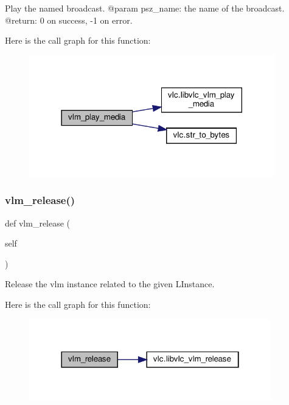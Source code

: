 \begin{DoxyVerb}Play the named broadcast.
@param psz_name: the name of the broadcast.
@return: 0 on success, -1 on error.
\end{DoxyVerb}
 Here is the call graph for this function\+:
\nopagebreak
\begin{figure}[H]
\begin{center}
\leavevmode
\includegraphics[width=302pt]{classvlc_1_1_instance_a7d5047e2733ed1a7c7713bf9c097395d_cgraph}
\end{center}
\end{figure}
\mbox{\label{classvlc_1_1_instance_a68523ebc1badf01d410514dbc5d822de}} 
\subsubsection{\texorpdfstring{vlm\+\_\+release()}{vlm\_release()}}
{\footnotesize\ttfamily def vlm\+\_\+release (\begin{DoxyParamCaption}\item[{}]{self }\end{DoxyParamCaption})}

\begin{DoxyVerb}Release the vlm instance related to the given L{Instance}.
\end{DoxyVerb}
 Here is the call graph for this function\+:
\nopagebreak
\begin{figure}[H]
\begin{center}
\leavevmode
\includegraphics[width=298pt]{classvlc_1_1_instance_a68523ebc1badf01d410514dbc5d822de_cgraph}
\end{center}
\end{figure}
\mbox{\label{classvlc_1_1_instance_a507fdd00d3a2be49e8336ea77a7fe315}} 

